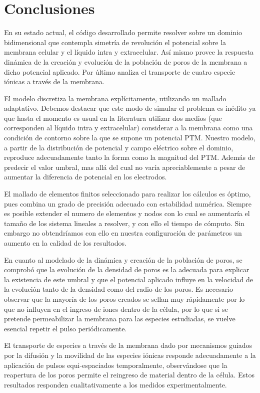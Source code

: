 \chapter{Conclusiones}

En su estado actual, el código desarrollado permite resolver sobre un dominio bidimensional que contempla simetría de revolución el potencial sobre la membrana celular y el líquido intra y extracelular. Así mismo provee la respuesta dinámica de la creación y evolución de la población de poros de la membrana a dicho potencial aplicado. Por último analiza el transporte de cuatro especie iónicas a través de la membrana.

El modelo discretiza la membrana explícitamente, utilizando un mallado adaptativo. Debemos destacar que este modo de simular el problema es inédito ya que hasta el momento es usual en la literatura utilizar dos medios (que corresponden al líquido intra y extracelular) considerar a la membrana como una condición de contorno sobre la que se supone un potencial PTM. Nuestro modelo, a partir de la distribución de potencial y campo eléctrico sobre el dominio, reproduce adecuadamente tanto la forma como la magnitud del PTM. Además de predecir el valor umbral, mas allá del cual no varía apreciablemente a pesar de aumentar la diferencia de potencial en los electrodos. 

El mallado de elementos finitos seleccionado para realizar los cálculos es óptimo, pues combina un grado de precisión adecuado con estabilidad numérica. Siempre es posible extender el numero de elementos y nodos con lo cual se aumentaría el tamaño de los sistema lineales a resolver, y con ello el tiempo de cómputo. Sin embargo no obtendríamos con ello en nuestra configuración de parámetros un aumento en la calidad de los resultados.

En cuanto al modelado de la dinámica y creación de la población de poros, se comprobó que la evolución de la densidad de poros es la adecuada para explicar la existencia de este umbral y que el potencial aplicado influye en la velocidad de la evolución tanto de la densidad como del radio de los poros. 
Es necesario observar que la mayoría de los poros creados se sellan muy rápidamente por lo que no influyen en el ingreso de iones dentro de la célula, por lo que si se pretende permeabilizar la membrana para las especies estudiadas, se vuelve esencial repetir el pulso periódicamente. 

El transporte de especies a través de la membrana dado por mecanismos guiados por la difusión y la movilidad de las especies iónicas responde adecuadamente a la aplicación de pulsos equi-espaciados temporalmente, observándose que la reapertura de los poros permite el reingreso de material dentro de la célula. Estos resultados responden cualitativamente a los medidos experimentalmente.\\ 

